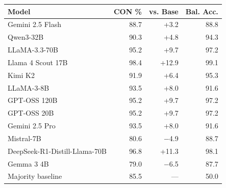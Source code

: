\begin{tabular}{lrrr}
\toprule
\textbf{Model} & \textbf{CON \%} & \textbf{vs. Base} & \textbf{Bal. Acc.} \\
\midrule
Gemini 2.5 Flash & 88.7 & +3.2 & 88.8 \\
Qwen3-32B & 90.3 & +4.8 & 94.3 \\
LLaMA-3.3-70B & 95.2 & +9.7 & 97.2 \\
Llama 4 Scout 17B & 98.4 & +12.9 & 99.1 \\
Kimi K2 & 91.9 & +6.4 & 95.3 \\
LLaMA-3-8B & 93.5 & +8.0 & 91.6 \\
GPT-OSS 120B & 95.2 & +9.7 & 97.2 \\
GPT-OSS 20B & 95.2 & +9.7 & 97.2 \\
Gemini 2.5 Pro & 93.5 & +8.0 & 91.6 \\
Mistral-7B & 80.6 & $-$4.9 & 88.7 \\
DeepSeek-R1-Distill-Llama-70B & 96.8 & +11.3 & 98.1 \\
Gemma 3 4B & 79.0 & $-$6.5 & 87.7 \\
\midrule
Majority baseline & 85.5 & --- & 50.0 \\
\bottomrule
\end{tabular}
